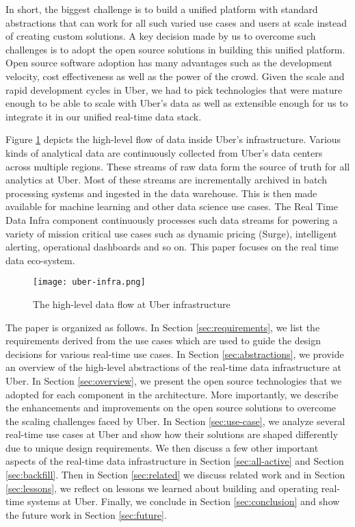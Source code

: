 \documentclass[sigconf]{acmart}
\begin{document}
In short, the biggest challenge is to build a unified platform with standard abstractions that can work for all such varied use cases and users at scale instead of creating custom solutions. A key decision made by us to overcome such challenges is to adopt the open source solutions in building this unified platform. Open source software adoption has many advantages such as the development velocity, cost effectiveness as well as the power of the crowd. Given the scale and rapid development cycles in Uber, we had to pick technologies that were mature enough to be able to scale with Uber’s data as well as extensible enough for us to integrate it in our unified real-time data stack. 

Figure \ref{fig:data-flow} depicts the high-level flow of data inside Uber's infrastructure. Various kinds of analytical data are continuously collected from Uber’s data centers across multiple regions. These streams of raw data form the source of truth for all analytics at Uber. Most of these streams are incrementally archived in batch processing systems and ingested in the data warehouse. This is then made available for machine learning and other data science use cases. The Real Time Data Infra component continuously processes such data streams for powering a variety of mission critical use cases such as dynamic pricing (Surge), intelligent alerting, operational dashboards and so on. This paper focuses on the real time data eco-system. 

\begin{figure}[h]
  \centering
  \texttt{[image: uber-infra.png]}
  \caption{The high-level data flow at Uber infrastructure}
  \label{fig:data-flow}
\end{figure}

The paper is organized as follows. In Section \ref{sec:requirements}, we list the requirements derived from the use cases which are used to guide the design decisions for various real-time use cases. In Section \ref{sec:abstractions}, we provide an overview of the high-level abstractions of the real-time data infrastructure at Uber. In Section \ref{sec:overview}, we present the open source technologies that we adopted for each component in the architecture. More importantly, we describe the enhancements and improvements on the open source solutions to overcome the scaling challenges faced by Uber. In Section \ref{sec:use-case}, we analyze several real-time use cases at Uber and show how their solutions are shaped differently due to unique design requirements. We then discuss a few other important aspects of the real-time data infrastructure in Section \ref{sec:all-active} and Section \ref{sec:backfill}. Then in Section \ref{sec:related} we discuss related work and in Section \ref{sec:lessons}, we reflect on lessons we learned about building and operating real-time systems at Uber. Finally, we conclude in Section \ref{sec:conclusion} and show the future work in Section \ref{sec:future}.
\end{document}
